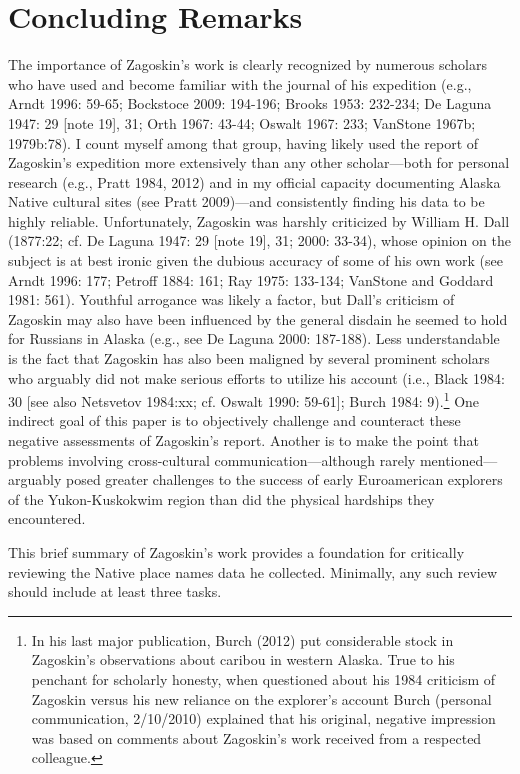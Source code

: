 \section*{Concluding Remarks}
The importance of Zagoskin’s work is clearly recognized by numerous scholars who have used and become familiar with the journal of his expedition (e.g., Arndt 1996: 59-65; Bockstoce 2009: 194-196; Brooks 1953: 232-234; De Laguna 1947: 29 [note 19], 31; Orth 1967: 43-44; Oswalt 1967: 233; VanStone 1967b; 1979b:78). I count myself among that group, having likely used the report of Zagoskin’s expedition more extensively than any other scholar—both for personal research (e.g., Pratt 1984, 2012) and in my official capacity documenting Alaska Native cultural sites (see Pratt 2009)—and consistently finding his data to be highly reliable. Unfortunately, Zagoskin was harshly criticized by William H. Dall (1877:22; cf. De Laguna 1947: 29 [note 19], 31; 2000: 33-34), whose opinion on the subject is at best ironic given the dubious accuracy of some of his own work (see Arndt 1996: 177; Petroff 1884: 161; Ray 1975: 133-134; VanStone and Goddard 1981: 561). Youthful arrogance was likely a factor, but Dall’s criticism of Zagoskin may also have been influenced by the general disdain he seemed to hold for Russians in Alaska (e.g., see De Laguna 2000: 187-188). Less understandable is the fact that Zagoskin has also been maligned by several prominent scholars who arguably did not make serious efforts to utilize his account (i.e., Black 1984: 30 [see also Netsvetov 1984:xx; cf. Oswalt 1990: 59-61]; Burch 1984: 9).\footnote{In his last major publication, Burch (2012) put considerable stock in Zagoskin’s observations about caribou in western Alaska. True to his penchant for scholarly honesty, when questioned about his 1984 criticism of Zagoskin versus his new reliance on the explorer’s account Burch (personal communication, 2/10/2010) explained that his original, negative impression was based on comments about Zagoskin’s work received from a respected colleague.} One indirect goal of this paper is to objectively challenge and counteract these negative assessments of Zagoskin’s report. Another is to make the point that problems involving cross-cultural communication—although rarely mentioned—arguably posed greater challenges to the success of early Euroamerican explorers of the Yukon-Kuskokwim region than did the physical hardships they encountered.

This brief summary of Zagoskin’s work provides a foundation for critically reviewing the Native place names data he collected. Minimally, any such review should include at least three tasks.

